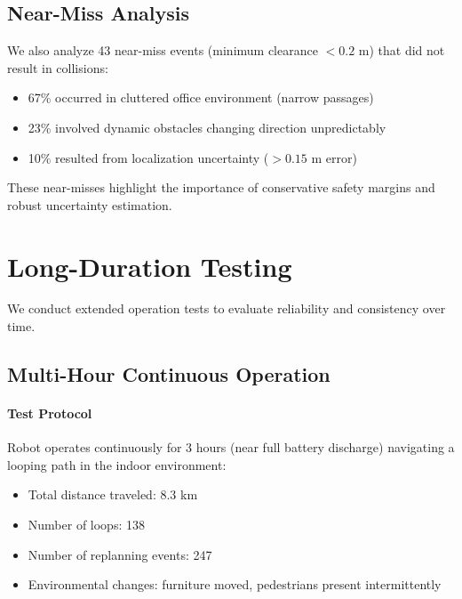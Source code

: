 
\subsection{Near-Miss Analysis}

We also analyze 43 near-miss events (minimum clearance $< 0.2$ m) that did not result in collisions:

\begin{itemize}
    \item 67\% occurred in cluttered office environment (narrow passages)
    \item 23\% involved dynamic obstacles changing direction unpredictably
    \item 10\% resulted from localization uncertainty ($> 0.15$ m error)
\end{itemize}

These near-misses highlight the importance of conservative safety margins and robust uncertainty estimation.

\section{Long-Duration Testing}
\label{sec:long_duration}

We conduct extended operation tests to evaluate reliability and consistency over time.

\subsection{Multi-Hour Continuous Operation}

\paragraph{Test Protocol}
Robot operates continuously for 3 hours (near full battery discharge) navigating a looping path in the indoor environment:
\begin{itemize}
    \item Total distance traveled: 8.3 km
    \item Number of loops: 138
    \item Number of replanning events: 247
    \item Environmental changes: furniture moved, pedestrians present intermittently
\end{itemize}

